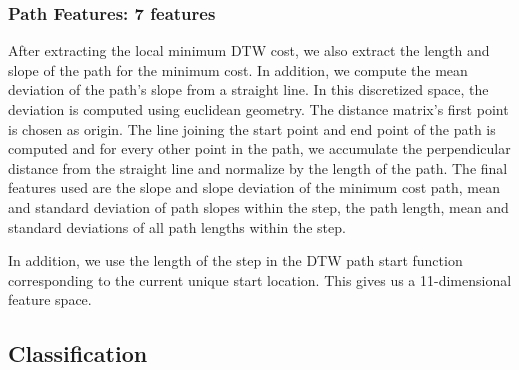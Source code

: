 \documentclass{article}
\begin{document}
\subsubsection{Path Features: 7 features}
After extracting the local minimum DTW cost, we also extract the length and slope of the path for the minimum cost. In addition, we compute the mean deviation of the path's slope from a straight line. In this discretized space, the deviation is computed using euclidean geometry. The distance matrix's first point is chosen as origin. The line joining the start point and end point of the path is computed and for every other point in the path, we accumulate the perpendicular distance from the straight line and normalize by the length of the path. The final features used are the slope and slope deviation of the minimum cost path, mean and standard deviation of path slopes within the step, the path length, mean and standard deviations of all path lengths within the step.

In addition, we use the length of the step in the DTW path start function corresponding to the current unique start location. This gives us a 11-dimensional feature space.




\subsection{Classification}
\label{class}
\end{document}
